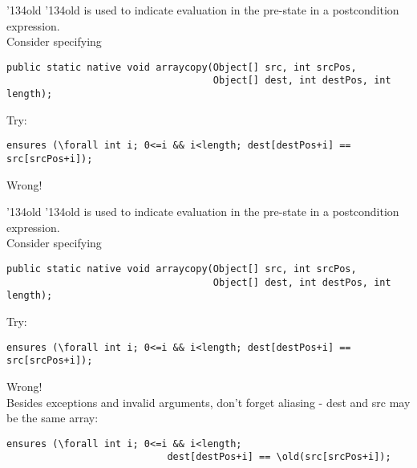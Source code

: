 \documentclass[
pdf,
nocolorBG,
slideColor,
cok,
]{prosper}
\newcommand{\bsl}{\char'134}
\newcommand{\old}{\bsl old}
\begin{document}
\begin{slide}{\old}
\vspace*{-6ex}
{\knalblue \old} is used to indicate evaluation in the pre-state in a postcondition expression.\\
\vspace{1ex}
Consider specifying
{\tiny
\begin{verbatim} 
public static native void arraycopy(Object[] src, int srcPos,
                                    Object[] dest, int destPos, int length);
\end{verbatim}
}
Try:
{\tiny
\begin{verbatim} 
ensures (\forall int i; 0<=i && i<length; dest[destPos+i] == src[srcPos+i]);
\end{verbatim}
}

{\red
Wrong!}\\

\end{slide}


\begin{slide}{\old}
\vspace*{-6ex}
{\knalblue \old} is used to indicate evaluation in the pre-state in a postcondition expression.\\
\vspace{1ex}
Consider specifying
{\tiny
\begin{verbatim} 
public static native void arraycopy(Object[] src, int srcPos,
                                    Object[] dest, int destPos, int length);
\end{verbatim}
}
Try:
{\tiny
\begin{verbatim} 
ensures (\forall int i; 0<=i && i<length; dest[destPos+i] == src[srcPos+i]);
\end{verbatim}
}

{\red
Wrong!}\\
\vspace{1ex}
Besides exceptions and invalid arguments, don't forget aliasing - {\blue dest} and {\blue src} may be the same array:
{\tiny
\begin{verbatim} 
ensures (\forall int i; 0<=i && i<length; 
                            dest[destPos+i] == \old(src[srcPos+i]);
\end{verbatim}
}

\end{slide}

\end{document}
